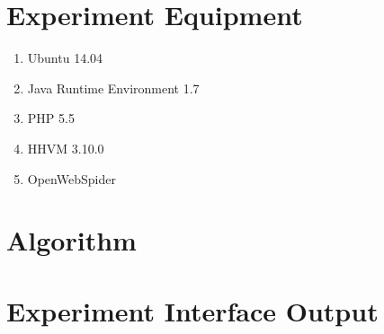 \begin{appendices}



\chapter{Experiment Equipment}
\begin{enumerate}
\item Ubuntu 14.04
\item Java Runtime Environment 1.7
\item PHP 5.5
\item HHVM 3.10.0
\item OpenWebSpider
\end{enumerate}

\chapter{Algorithm}
\label{appendix:algorithm}

\chapter{Experiment Interface Output}
\label{appendix:output}



\end{appendices}